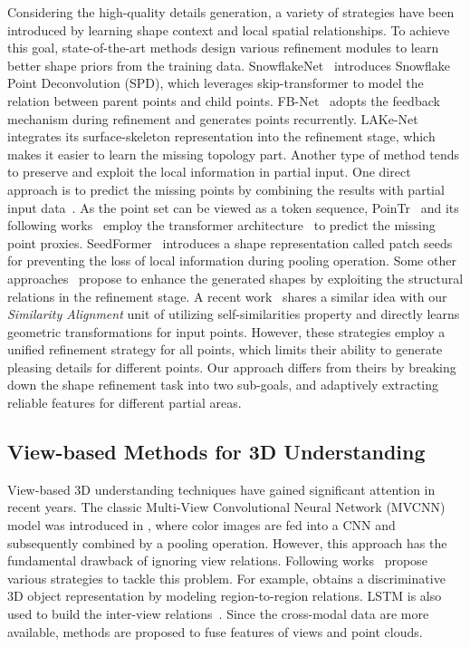 Considering the high-quality details generation, a variety of strategies have been introduced by learning shape context and local spatial relationships. 
To achieve this goal, state-of-the-art methods design various refinement modules to learn better shape priors from the training data.
SnowflakeNet~\citep{9928787} introduces Snowflake Point Deconvolution (SPD), which leverages skip-transformer to model the relation between parent points and child points. 
FB-Net~\citep{yan2022fbnet} adopts the feedback mechanism during refinement and generates points recurrently.
LAKe-Net~\citep{tang2022lake} integrates its surface-skeleton representation into the refinement stage, which makes it easier to learn the missing topology part.
Another type of method tends to preserve and exploit the local information in partial input.
One direct approach is to predict the missing points by combining the results with partial input data~\citep{huang2020pf,yu2021pointr}. As the point set can be viewed as a token sequence, PoinTr~\citep{yu2021pointr} and its following works~\citep{10232862,li2023proxyformer,chen2023anchorformer} employ the transformer architecture~\citep{vaswani2017attention} to predict the missing point proxies.
SeedFormer~\citep{zhou2022seedformer} introduces a shape representation called patch seeds for preventing the loss of local information during pooling operation. 
Some other approaches~\citep{pan2020ecg,10106495,zhang2022point,chen2019multi} propose to enhance the generated shapes by exploiting the structural relations in the refinement stage.
A recent work~\citep{DBLP:journals/ijcv/ZhangLXNZTL23} shares a similar idea with our \emph{Similarity Alignment} unit of utilizing self-similarities property and directly learns geometric transformations for input points.
However, these strategies employ a unified refinement strategy for all points, which limits their ability to generate pleasing details for different points.
Our approach differs from theirs by breaking down the shape refinement task into two sub-goals, and adaptively extracting reliable features for different partial areas.

\subsection{View-based Methods for 3D Understanding}
View-based 3D understanding techniques have gained significant attention in recent years.
The classic Multi-View Convolutional Neural Network (MVCNN) model was introduced in \citep{su2015multi}, where color images are fed into a CNN and subsequently combined by a pooling operation. However, this approach has the fundamental drawback of ignoring view relations.
Following works~\citep{feng2018gvcnn,wei2022learning,han20193d2seqviews,yang2019learning,chen2022imlovenet} propose various strategies to tackle this problem. For example,
\cite{yang2019learning} obtains a discriminative 3D object representation by modeling region-to-region relations.
LSTM is also used to build the inter-view relations~\citep{dai2018siamese}.
Since the cross-modal data are more available, methods are proposed to fuse features of views and point clouds.


